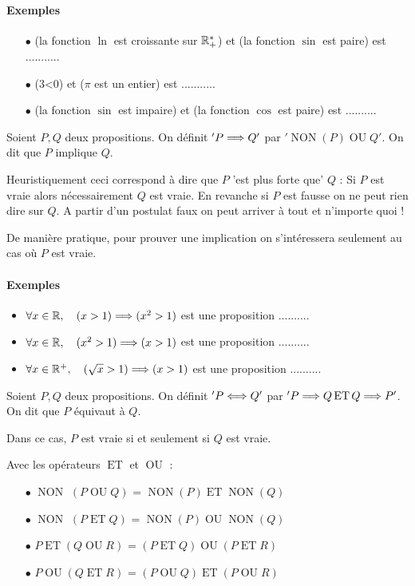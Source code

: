 \documentclass[a4paper, 11pt]{article}
\DeclareMathOperator{\NON}{NON}
\DeclareMathOperator{\ET}{ET}
\DeclareMathOperator{\OU}{OU}
\begin{document}
\paragraph{Exemples}
\begin{itemize}
\item[$\bullet$] (la fonction $\ln{}$ est croissante sur $\mathbb{R}_+^*$) et (la fonction $\sin{}$ est paire) est ...........
\item[$\bullet$] (3<0) et ($\pi$ est un entier) est  ...........
\item[$\bullet$] (la fonction $\sin{}$ est impaire) et (la fonction $\cos{}$ est paire) est  ..........
\end{itemize}


\begin{defi}
Soient $P, Q$ deux propositions. On définit $'P \Longrightarrow Q'$ par 
$ '\NON(P)  \OU Q'$. On dit que $P$ implique $Q$. 
\end{defi}
Heuristiquement ceci correspond à dire que $P$ 'est plus forte que' $Q$ : Si $P$ est vraie alors nécessairement $Q$ est vraie. En revanche si $P$ est fausse on ne peut rien dire sur $Q$. A partir d'un postulat faux on peut arriver à tout et n'importe quoi ! 

De manière pratique, pour prouver une implication on s'intéressera seulement au cas où $P$ est vraie.
\paragraph{Exemples}
\begin{itemize}
    \item $\forall x\in \mathbb{R}, \quad  (x>1) \Longrightarrow (x^2>1)$ est une proposition ..........
    \item $\forall x\in \mathbb{R}, \quad  (x^2>1) \Longrightarrow (x>1)$ est une proposition ..........
    \item $\forall x\in \mathbb{R}^+, \quad  (\sqrt{x}>1) \Longrightarrow (x>1)$ est une proposition ..........
\end{itemize}

\begin{defi}
Soient $P, Q$ deux propositions. On définit $'P \Longleftrightarrow Q'$ par 
$ 'P \implique Q \ET Q \implique P'$. On dit que $P$ équivaut à  $Q$. 
\end{defi}
Dans ce cas, $P$ est vraie si et seulement si $Q$ est vraie. 



\begin{prop} Avec les op\'erateurs $\ET$ et $\OU$ :
\begin{itemize}
\item[$\bullet$]  $\NON$ $(P \OU  Q)$ = $\NON(P)  \ET \NON(Q)$
\item[$\bullet$]  $\NON$ $(P \ET  Q)$ = $\NON(P) \OU \NON(Q)$
\item[$\bullet$] $P \ET (Q \OU R)$ = $(P \ET Q) \OU (P\ET R)$
\item[$\bullet$] $P {\OU} (Q {\ET} R)$ = $(P \OU Q) \ET (P\OU R)$
\end{itemize}
\end{prop}
\end{document}
